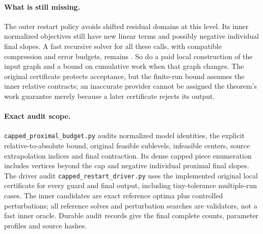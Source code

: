 \paragraph{What is still missing.}
The outer restart policy avoids shifted residual domains at this level.
Its inner normalized objectives still have new linear terms and possibly
negative individual final slopes. A fast recursive solver for all these
calls, with compatible compression and error budgets, remains
\statusopen. So do a paid local construction of the input graph and a
bound on cumulative work when that graph changes. The original certificate
protects acceptance, but the finite-run bound assumes the inner relative
contracts; an inaccurate provider cannot be assigned the theorem's work
guarantee merely because a later certificate rejects its output.

\paragraph{Exact audit scope.}
\texttt{capped\_proximal\_budget.py} audits normalized model identities,
the explicit relative-to-absolute bound, original feasible sublevels,
infeasible centers, source extrapolation indices and final contraction.
Its dense capped piece enumeration includes vertices beyond the cap and
negative individual proximal final slopes. The driver audit
\texttt{capped\_restart\_driver.py} uses the implemented original local
certificate for every guard and final output, including tiny-tolerance
multiple-run cases. The inner candidates are exact reference optima plus
controlled perturbations; all reference solves and perturbation searches
are validators, not a fast inner oracle. Durable audit records give the
final complete counts, parameter profiles and source hashes.
